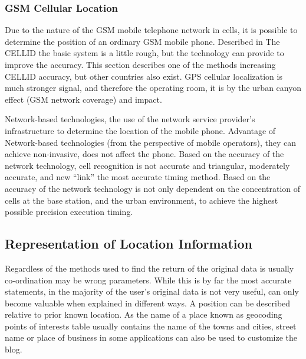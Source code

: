 \documentclass[12pt,a4paper]{article}
\begin{document}
\subsubsection{GSM Cellular Location} %
\label{ssub:gsm_cellular_location}
Due to the nature of the GSM mobile telephone network in cells, it is possible to determine the position of an ordinary GSM mobile phone. Described in The CELLID the basic system is a little rough, but the technology can provide to improve the accuracy. This section describes one of the methods increasing CELLID accuracy, but other countries also exist. GPS cellular localization is much stronger signal, and therefore the operating room, it is by the urban canyon effect (GSM network coverage) and impact. \cite{DRoza:2003wz}

Network-based technologies, the use of the network service provider's infrastructure to determine the location of the mobile phone. Advantage of Network-based technologies (from the perspective of mobile operators), they can achieve non-invasive, does not affect the phone. Based on the accuracy of the network technology, cell recognition is not accurate and triangular, moderately accurate, and new ``link'' the most accurate timing method. Based on the accuracy of the network technology is not only dependent on the concentration of cells at the base station, and the urban environment, to achieve the highest possible precision execution timing. \cite{wiki-cellloc}


\subsection{Representation of Location Information} %
\label{sub:representation_of_location_information}
Regardless of the methods used to find the return of the original data is usually co-ordination may be wrong parameters. While this is by far the most accurate statements, in the majority of the user's original data is not very useful, can only become valuable when explained in different ways. A position can be described relative to prior known location. As the name of a place known as geocoding points of interests table usually contains the name of the towns and cities, street name or place of business in some applications can also be used to customize the blog. \cite{DRoza:2003wz}

\end{document}
